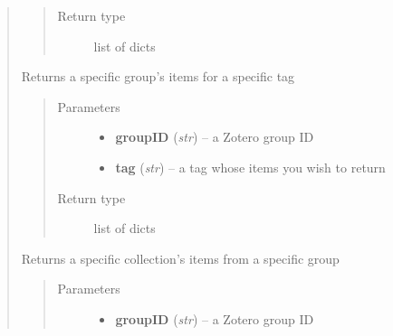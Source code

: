 \documentclass[letterpaper,10pt,english]{sphinxmanual}
\begin{document}
\begin{quote}
\begin{fulllineitems}
\begin{quote}
\begin{description}
\begin{itemize}
\end{itemize}

\item[{Return type}] \leavevmode
list of dicts

\end{description}\end{quote}

\end{fulllineitems}


\begin{fulllineitems}
\label{index:pyzotero.zotero.Zotero.group_items_tag}
Returns a specific group's items for a specific tag
\begin{quote}\begin{description}
\item[{Parameters}] \leavevmode\begin{itemize}
\item {} 
\textbf{groupID} (\emph{str}) -- a Zotero group ID

\item {} 
\textbf{tag} (\emph{str}) -- a tag whose items you wish to return

\end{itemize}

\item[{Return type}] \leavevmode
list of dicts

\end{description}\end{quote}

\end{fulllineitems}


\begin{fulllineitems}
\label{index:pyzotero.zotero.Zotero.group_collection_items}
Returns a specific collection's items from a specific group
\begin{quote}\begin{description}
\item[{Parameters}] \leavevmode\begin{itemize}
\item {} 
\textbf{groupID} (\emph{str}) -- a Zotero group ID


\end{itemize}
\end{description}
\end{quote}
\end{fulllineitems}
\end{quote}
\end{document}
